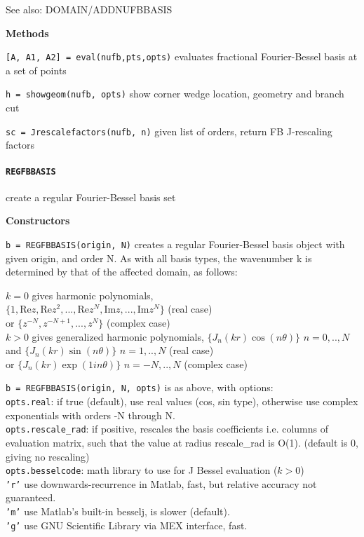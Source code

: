 See also: DOMAIN/ADDNUFBBASIS

\textbf{Methods}

{\tt [A, A1, A2] = eval(nufb,pts,opts)} evaluates fractional
Fourier-Bessel basis at a set of points 

{\tt h = showgeom(nufb, opts)} 
show corner wedge location, geometry and branch cut

{\tt sc = Jrescalefactors(nufb, n)} given list of orders, return FB
J-rescaling factors


\newpage

\paragraph{\tt REGFBBASIS} create a regular Fourier-Bessel basis set

\textbf{Constructors}

{\tt b = REGFBBASIS(origin, N)} creates a regular Fourier-Bessel basis object
   with given origin, and order N. As with all basis types, the wavenumber
   k is determined by that of the affected domain, as follows:

   $k=0$ gives harmonic polynomials,\\
       $\{1, \text{Re} z, \text{Re} z^2, ..., \text{Re} z^N, \text{Im} z, ..., \text{Im} z^N\}$ (real case)\\
    or $\{z^{-N}, z^{-N+1}, ..., z^N\}$ (complex case)\\
  $k>0$ gives generalized harmonic polynomials,
       $\{J_n(kr)\cos(n\theta)\}$ $n=0,..,N$ and
       $\{J_n(kr)\sin(n\theta)\}$ $n=1,..,N$ (real case)\\
    or $\{J_n(kr)\exp(1in\theta)\}$ $n=-N,..,N$ (complex case)

  {\tt b = REGFBBASIS(origin, N, opts)} is as above, with options:\\
   {\tt opts.real}: if true (default), use real values (cos, sin
   type), otherwise use complex exponentials with orders -N through N.\\
  {\tt opts.rescale\_rad}: if positive, rescales the basis coefficients i.e.
              columns of evaluation matrix, such that the value at radius
              rescale\_rad is O(1). (default is 0, giving no rescaling)\\
   {\tt opts.besselcode}: math library to use for J Bessel evaluation ($k>0$)\\
              {\tt 'r'} use downwards-recurrence in Matlab, fast, but
                       relative accuracy not guaranteed.\\
              {\tt 'm'} use Matlab's built-in besselj, is slower (default).\\
              {\tt 'g'} use GNU Scientific Library via MEX interface, fast.


